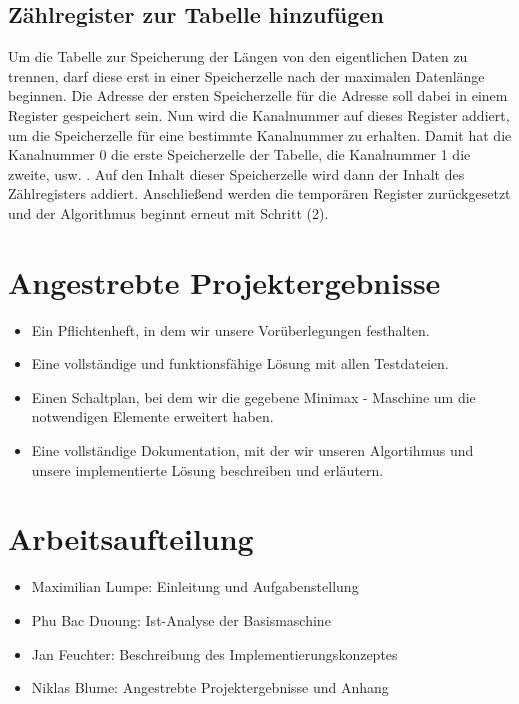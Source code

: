 \documentclass[12pt,titlepage,german,a4]{article}
\begin{document}
    \subsection{Z{\"a}hlregister zur Tabelle hinzuf{\"u}gen}
    Um die Tabelle zur Speicherung der L{\"a}ngen von den eigentlichen Daten zu trennen, darf diese erst in einer Speicherzelle nach der maximalen Datenl{\"a}nge beginnen. Die Adresse der ersten Speicherzelle f{\"u}r die Adresse soll dabei in einem Register gespeichert sein. Nun wird die Kanalnummer auf dieses Register addiert, um die Speicherzelle f{\"u}r eine bestimmte Kanalnummer zu erhalten. Damit hat die Kanalnummer 0 die erste Speicherzelle der Tabelle, die Kanalnummer 1 die zweite, usw. . Auf den Inhalt dieser Speicherzelle wird dann der Inhalt des Z{\"a}hlregisters addiert. Anschlie{\ss}end werden die tempor{\"a}ren Register zur{\"u}ckgesetzt und der Algorithmus beginnt erneut mit Schritt (2).



    \section{Angestrebte Projektergebnisse}
        \begin{itemize}
			\item Ein Pflichtenheft, in dem wir unsere Vor{\"u}berlegungen festhalten.
			\item Eine vollst{\"a}ndige und funktionsf{\"a}hige L{\"o}sung mit allen Testdateien.
			\item Einen Schaltplan, bei dem wir die gegebene Minimax - Maschine um die notwendigen Elemente erweitert haben.
			\item Eine vollst{\"a}ndige Dokumentation, mit der wir unseren Algortihmus und unsere implementierte L{\"o}sung beschreiben und erl{\"a}utern.
        \end{itemize}

	\section{Arbeitsaufteilung}
		\begin{itemize}
			\item Maximilian Lumpe: Einleitung und Aufgabenstellung
			\item Phu Bac Duoung: Ist-Analyse der Basismaschine
			\item Jan Feuchter: Beschreibung des Implementierungskonzeptes
			\item Niklas Blume: Angestrebte Projektergebnisse und Anhang
		\end{itemize}
\end{document}
